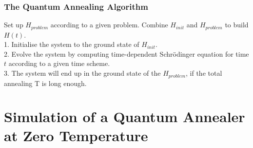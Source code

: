 \documentclass{beamer}
\begin{document}
\begin{frame}
	\frametitle{The Quantum Annealing Algorithm}
	\begin{tcolorbox}[title=Quantum Annealing Algorithm]
		Set up $H_{problem}$ according to a given problem. Combine $H_{init}$ and $H_{problem}$ to build $H(t)$. \\
		
		1. Initialise the system to the ground state of $H_{init}$.\\ %
		
		
		
		2. Evolve the system by computing time-dependent Schrödinger equation for time $t$ according to a given time scheme. \\
		
		3. The system will end up in the ground state of the $H_{problem}$, if the total annealing T is long enough.\\
		
	\end{tcolorbox} 
\end{frame}


\section{Simulation of a Quantum Annealer at Zero Temperature}
\end{document}

